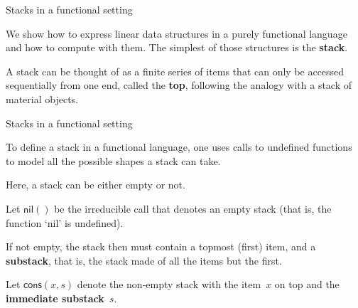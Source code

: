 \documentclass[compress,dvipdfmx]{beamer}
\newcommand\fun[1]{\textsf{#1}}
\begin{document}
%
\begin{frame}{Stacks in a functional setting}

  We show how to express linear data structures in a purely functional
  language and how to compute with them. The simplest of those
  structures is the \textbf{stack}.

  \bigskip

  A stack can be thought of as a finite series of items that can only
  be accessed sequentially from one end, called the \textbf{top},
  following the analogy with a stack of material objects.

\end{frame}

%
\begin{frame}{Stacks in a functional setting}

  To define a stack in a functional language, one uses calls to
  undefined functions to model all the possible shapes a stack can
  take.

  \bigskip

  Here, a stack can be either empty or not.

  \bigskip

  Let \(\fun{nil}()\) be the irreducible call that denotes an empty
  stack (that is, the function `\fun{nil}' is undefined).

  \bigskip

  If not empty, the stack then must contain a topmost (first) item,
  and a \textbf{substack}, that is, the stack made of all the items
  but the first.

  \bigskip

  Let \(\fun{cons}(x,s)\) denote the non\hyp{}empty stack with the
  item~\(x\) on top and the \textbf{immediate substack}~\(s\).

\end{frame}
\end{document}
